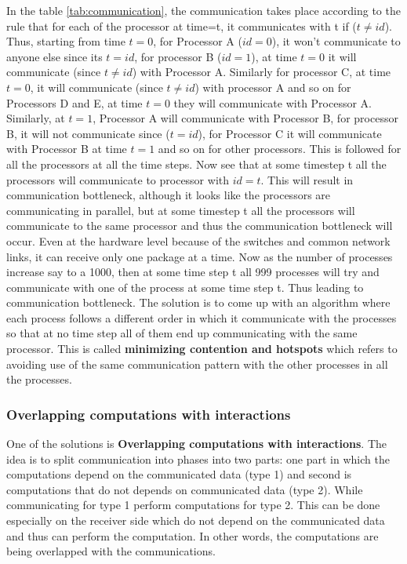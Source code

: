 \documentclass[12pt]{article}
\begin{document}
In the table \ref{tab:communication}, 
the communication takes place according to the rule that for each of the processor at time=t, it communicates with t if ($t\neq id$).
Thus, starting from time $t=0$, for Processor A ($id=0$), it won't communicate to anyone else since its $t=id$, for processor B ($id=1$), at time $t=0$
it will communicate (since $t\neq id$) with Processor A.
Similarly for processor C, at time $t=0$, it will communicate (since $t\neq id$) with processor A and so on for Processors D and E, at time $t=0$ they will communicate with Processor A. 
Similarly, at $t=1$, Processor A will communicate with Processor B, for processor B, it will not communicate since ($t =id$), for Processor C it will communicate with Processor B at time $t=1$ and so on for other processors.
This is followed for all the processors at all the time steps.
Now see that at some timestep t all the processors will communicate to processor with $id=t$. This will result in communication bottleneck, although it looks like the processors are communicating in parallel,
but at some timestep t all the processors will communicate to the same processor and thus the communication bottleneck will occur. Even at the hardware level because of the switches and common network links, it can receive only one package at a time.
Now as the number of processes increase say to a 1000, then at some time step t all 999 processes will try and communicate with one of the process at some time step t. Thus leading to communication bottleneck.
The solution is to come up with an algorithm where each process follows a different order in which it communicate with the processes so that at no time step all of them end up communicating with the same processor.
This is called \textbf{minimizing contention and hotspots} which refers to avoiding use of the same communication pattern with the other processes in all the processes.

\subsubsection{Overlapping computations with interactions}
One of the solutions is \textbf{Overlapping computations with interactions}. The idea is to split communication into phases into two parts: one part in which the computations depend 
on  the communicated data (type 1) and second is computations that do not depends on communicated data (type 2). While communicating for type 1 perform computations for type 2.
This can be done especially on the receiver side which do not depend on the communicated data and thus can perform the computation. In other words, the computations are being overlapped with the communications.
\end{document}
